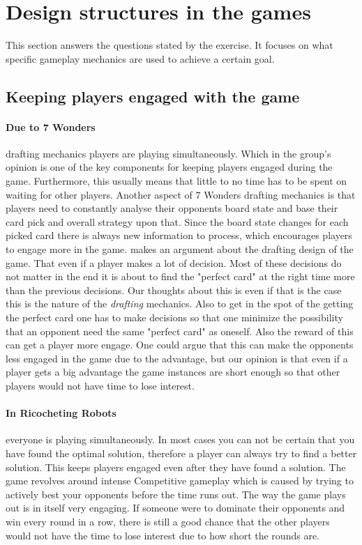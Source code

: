 \documentclass[a4paper]{article}
\begin{document}
\section{Design structures in the games}
This section answers the questions stated by the exercise. It focuses on what  specific gameplay mechanics are used to achieve a certain goal. 

\subsection{Keeping players engaged with the game}
\paragraph{Due to 7 Wonders} drafting mechanics players are playing simultaneously. Which in the group's opinion is one of the key components for keeping players engaged during the game. Furthermore, this usually means that little to no time has to be spent on waiting for other players. Another aspect of 7 Wonders drafting mechanics is that players need to constantly analyse their opponents board state and base their card pick and overall strategy upon that. Since the board state changes for each picked card there is always new information to process, which encourages players to engage more in the game.
 makes an argument about the drafting design of the game.
That even if a player makes a lot of decision.
Most of these decisions do not matter in the end it is about to find the "perfect card" at the right time more than the previous decisions.
Our thoughts about this is even if that is the case this is the nature of the \textit{drafting} mechanics.
Also to get in the spot of the getting the perfect card one has to make decisions so that one minimize the possibility that an opponent need the same "perfect card" as oneself.
Also the reward of this can get a player more engage. One could argue that this can make the opponents less engaged in the game due to the advantage, but our opinion is that even if a player gets a big advantage the game instances are short enough so that other players would not have time to lose interest.  

\paragraph{In Ricocheting Robots} everyone is playing simultaneously. In most cases you can not be certain that you have found the optimal solution, therefore a player can always try to find a better solution. This keeps players engaged even after they have found a solution. The game revolves around intense Competitive gameplay which is caused by trying to actively best your opponents before the time runs out. The way the game plays out is in itself very engaging. If someone were to dominate their opponents and win every round in a row, there is still a good chance that the other players would not have the time to lose interest due to how short the rounds are.
\end{document}
